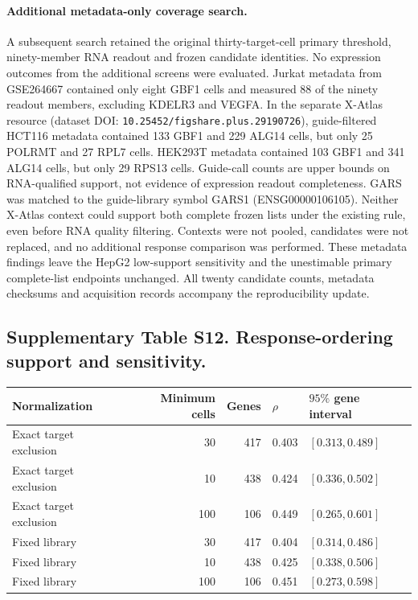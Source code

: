 \documentclass[a4paper,fleqn]{cas-sc}
\makeatletter
\DeclareRobustCommand{\rev}[1]{{\color{red}\def\@citecolor{black}\def\@linkcolor{red}\def\@urlcolor{red}#1}}
\makeatother
\begin{document}
\paragraph{\rev{Additional metadata-only coverage search.}}
\rev{A subsequent search retained the original thirty-target-cell primary threshold, ninety-member RNA readout and frozen candidate identities.} \rev{No expression outcomes from the additional screens were evaluated.} \rev{Jurkat metadata from GSE264667 contained only eight GBF1 cells and measured 88 of the ninety readout members, excluding KDELR3 and VEGFA.} \rev{In the separate X-Atlas resource (dataset DOI: \nolinkurl{10.25452/figshare.plus.29190726}), guide-filtered HCT116 metadata contained 133 GBF1 and 229 ALG14 cells, but only 25 POLRMT and 27 RPL7 cells.} \rev{HEK293T metadata contained 103 GBF1 and 341 ALG14 cells, but only 29 RPS13 cells.} \rev{Guide-call counts are upper bounds on RNA-qualified support, not evidence of expression readout completeness.} \rev{GARS was matched to the guide-library symbol GARS1 (ENSG00000106105).} \rev{Neither X-Atlas context could support both complete frozen lists under the existing rule, even before RNA quality filtering.} \rev{Contexts were not pooled, candidates were not replaced, and no additional response comparison was performed.} \rev{These metadata findings leave the HepG2 low-support sensitivity and the unestimable primary complete-list endpoints unchanged.} \rev{All twenty candidate counts, metadata checksums and acquisition records accompany the reproducibility update.}

\subsection*{\rev{Supplementary Table S12. Response-ordering support and sensitivity.}}

\begin{center}
\begin{tabular}{lrrll}
\toprule
\rev{Normalization} & \rev{Minimum cells} & \rev{Genes} & \rev{$\rho$} & \rev{$95\%$ gene interval}\\
\midrule
\rev{Exact target exclusion} & \rev{30} & \rev{417} & \rev{0.403} & \rev{$[0.313,0.489]$}\\
\rev{Exact target exclusion} & \rev{10} & \rev{438} & \rev{0.424} & \rev{$[0.336,0.502]$}\\
\rev{Exact target exclusion} & \rev{100} & \rev{106} & \rev{0.449} & \rev{$[0.265,0.601]$}\\
\rev{Fixed library} & \rev{30} & \rev{417} & \rev{0.404} & \rev{$[0.314,0.486]$}\\
\rev{Fixed library} & \rev{10} & \rev{438} & \rev{0.425} & \rev{$[0.338,0.506]$}\\
\rev{Fixed library} & \rev{100} & \rev{106} & \rev{0.451} & \rev{$[0.273,0.598]$}\\
\bottomrule
\end{tabular}
\end{center}
\end{document}
